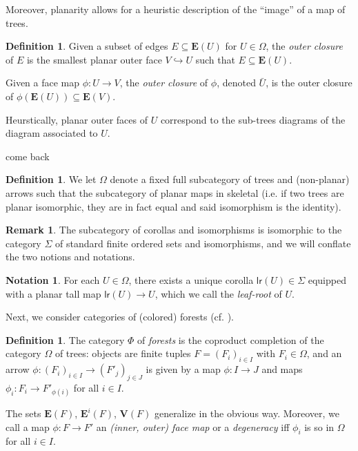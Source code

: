 \documentclass[a4paper,10pt
,draft
]{article}%
\numberwithin{equation}{section}
\numberwithin{figure}{section}
\theoremstyle{definition} %
\newtheorem{definition}[equation]{Definition}%
\newtheorem{remark}[equation]{Remark}%
\newtheorem{notation}[equation]{Notation}%
\newcommand{\into}{\hookrightarrow}%
\newcommand{\1}{\ensuremath{\mathbbm 1}}%
\begin{document}
Moreover, planarity allows for a heuristic description of the ``image'' of a map of trees.
\begin{definition}
      Given a subset of edges $E \subseteq \boldsymbol{E}(U)$ for $U \in \Omega$,
      the \textit{outer closure} of $E$ is
      the smallest planar outer face $V \into U$ such that $E \subseteq \boldsymbol{E}(U)$.
      
      Given a face map $\phi \colon U \to V$, the \textit{outer closure} of $\phi$, denoted $\bar{U}$,
      is the outer closure of $\phi(\boldsymbol{E}(U)) \subseteq \boldsymbol{E}(V)$.
\end{definition}
Heurstically, planar outer faces of $U$ correspond to the sub-trees diagrams of the diagram associated to $U$.


{\color{blue} come back}


      

\begin{definition}
      We let $\Omega$ denote a fixed full subcategory of trees and (non-planar) arrows
      such that the subcategory of planar maps in skeletal (i.e. if two trees are planar isomorphic, they are in fact equal and said isomorphism is the identity).
\end{definition}

\begin{remark}
      The subcategory of corollas and isomorphisms is isomorphic to the category $\Sigma$ of standard finite ordered sets and isomorphisms,
      and we will conflate the two notions and notations.
\end{remark}

\begin{notation}
      \label{LR_NOT}
      For each $U \in \Omega$, there exists a unique corolla $\mathsf{lr}(U) \in \Sigma$ equipped with a planar tall map $\mathsf{lr}(U) \to U$,
      which we call the \textit{leaf-root} of $U$.
\end{notation}


Next, we consider categories of (colored) forests (cf. \cite[Defn. 2.56]{BP_HGOP}).

\begin{definition}
      The category $\Phi$ of \textit{forests} is the coproduct completion of the category $\Omega$ of trees:
      objects are finite tuples $F = (F_i)_{i \in I}$ with $F_i \in \Omega$,
      and an arrow $\phi \colon (F_i)_{i \in I} \to (F'_j)_{j \in J}$ is given by
      a map $\phi \colon I \to J$ and
      maps $\phi_i \colon F_i \to F'_{\phi(i)}$ for all $i \in I$.
     
      The sets $\boldsymbol{E}(F)$, $\boldsymbol{E}^i(F)$, $\boldsymbol{V}(F)$ generalize in the obvious way.
      Moreover, we call a map $\phi \colon F \to F'$ an \textit{(inner, outer) face map} or a \textit{degeneracy} iff
      $\phi_i$ is so in $\Omega$ for all $i \in I$.
\end{definition}
\end{document}
